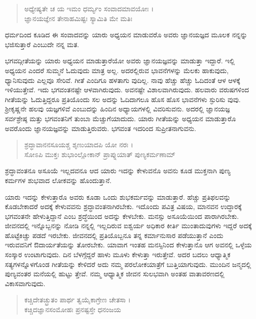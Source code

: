 \begin{verse}
ಅಧ್ಯೇಷ್ಯತೇ ಚ ಯ ಇಮಂ ಧರ್ಮ್ಯಂ ಸಂವಾದಮಾವಯೋಃ ।\\ಜ್ಞಾನಯಜ್ಞೇನ ತೇನಾಹಮಿಷ್ಟಃ ಸ್ಯಾಮಿತಿ ಮೇ ಮತಿಃ 
\end{verse}

{\small ಧರ್ಮದಿಂದ ಕೂಡಿದ ಈ ಸಂವಾದವನ್ನು ಯಾರು ಅಧ್ಯಯನ ಮಾಡುವರೊ ಅವರು ಜ್ಞಾನಯಜ್ಞದ ಮೂಲಕ ನನ್ನನ್ನು ಭಜಿಸುತ್ತಾರೆ ಎಂಬುದೇ ನನ್ನ ಮತ.}

ಭಗವದ್ಗೀತೆಯನ್ನು ಯಾರು ಅಧ್ಯಯನ ಮಾಡುತ್ತಾರೆಯೋ ಅವರು ಜ್ಞಾನಯಜ್ಞವನ್ನು ಮಾಡುತ್ತಾ ಇದ್ದಾರೆ. ಇಲ್ಲಿ ಅಧ್ಯಯನ ಎಂದರೆ ಸುಮ್ಮನೆ ಓದುವುದು ಮಾತ್ರ ಅಲ್ಲ. ಅದರಲ್ಲಿರುವ ಭಾವನೆಗಳನ್ನು ಮೆಲಕು ಹಾಕುವುದು, ಧ್ಯಾನಿಸುವುದು ಎಲ್ಲವೂ ಸೇರಿವೆ. ಗೀತೆ ಎಂದಿಗೂ ಹಳತಾಗು ವುದಿಲ್ಲ. ನಾವು ಹೆಚ್ಚು ಹೆಚ್ಚು ಓದಿದಂತೆ ಆಳ ಆಳಕ್ಕೆ ಇಳಿಯುತ್ತೇವೆ. ಇದು ಭಗವಂತನಷ್ಟೇ ಆಳವಾಗಿರುವುದು. ಅವನಷ್ಟೇ ವಿಶಾಲವಾಗಿರುವುದು. ಹಲವಾರು ವರುಷಗಳಿಂದ ಗೀತೆಯನ್ನು ಓದುತ್ತಿದ್ದರೂ ಪ್ರತಿಯೊಂದು ಸಲ ಅದನ್ನು ಓದಿದಾಗಲೂ ಹೊಸ ಹೊಸ ಭಾವನೆಗಳು ಸ್ಫುರಿಸು ವುವು. ಶ್ರೀಕೃಷ್ಣನೇ ಹಲವು ಯಜ್ಞಗಳಿವೆ ಎಂಬುದನ್ನು ಹಿಂದಿನ ಅಧ್ಯಾಯಗಳಲ್ಲಿ ವಿವರಿಸುವನು. ಅದರಲ್ಲಿ ಜ್ಞಾನಯಜ್ಞ ಸರ್ವಶ್ರೇಷ್ಠ ಮತ್ತು ಭಗವಂತನಿಗೆ ತುಂಬಾ ಮೆಚ್ಚುಗೆಯಾದುದು. ಯಾರು ಗೀತೆಯನ್ನು ಅಧ್ಯಯನ ಮಾಡುತ್ತಾರೊ ಅವರೊಂದು ಜ್ಞಾನಯಜ್ಞವನ್ನು ಮಾಡುತ್ತಿರುವರು. ಭಗವಂತ ಇದರಿಂದ ಸುಪ್ರೀತನಾಗುವನು.

\begin{verse}
ಶ್ರದ್ಧಾವಾನನಸೂಯಶ್ಚ ಶೃಣುಯಾದಪಿ ಯೋ ನರಃ ।\\ಸೋಽಪಿ ಮುಕ್ತಃ ಶುಭಾಂಲ್ಲೋಕಾನ್ ಪ್ರಾಪ್ನುಯಾತ್ ಪುಣ್ಯಕರ್ಮಣಾಮ್ 
\end{verse}

{\small ಶ್ರದ್ಧಾವಂತನೂ ಅಸೂಯೆ ಇಲ್ಲದವನೂ ಆದ ಯಾರು ಇದನ್ನು ಕೇಳುವನೊ ಅವನು ಕೂಡ ಮುಕ್ತನಾಗಿ ಪುಣ್ಯ ಕರ್ಮಗಳ ಶುಭವಾದ ಲೋಕವನ್ನು ಹೊಂದುತ್ತಾನೆ.}

ಯಾರು ಇದನ್ನು ಕೇಳುತ್ತಾರೊ ಅವರು ಕೂಡಾ ಒಂದು ಶುಭಕರ್ಮವನ್ನು ಮಾಡುತ್ತಾರೆ. ಹೆಚ್ಚು ಪ್ರತಿಫಲವನ್ನು ಕೊಡಬೇಕಾದರೆ ಅದಕ್ಕೆ ಕೇಳುವವನು ಶ್ರದ್ಧಾವಂತನಾಗಿರಬೇಕು. ಇದೊಂದು ಪವಿತ್ರ ವಿಷಯ, ಮಾನವನ ಉದ್ಧಾರಕ್ಕೆ ಭಗವಂತನೇ ಹೇಳುತ್ತಿದ್ದಾನೆ ಎಂಬ ಶ್ರದ್ಧೆಯಿಂದ ಅದನ್ನು ಕೇಳಬೇಕು. ಮನಸ್ಸು ಅಸೂಯೆಯಿಂದ ಪಾರಾಗಿರಬೇಕು. ಜೀವನದಲ್ಲಿ ಇನ್ನೊಬ್ಬನನ್ನು ನೋಡಿ ನನ್ನಲ್ಲಿ ಇಲ್ಲದಿರುವ ಐಶ್ವರ್ಯ ಅಧಿಕಾರ ಕೀರ್ತಿ ಮುಂತಾದುವುಗಳು ಇದ್ದರೆ ಅದಕ್ಕೆ ಹೊಟ್ಟೆಕಿಚ್ಚು ಪಡದೆ ಇರಬೇಕು. ಜೀವನದಲ್ಲಿ ಪ್ರತಿಯೊಬ್ಬನೂ ತನ್ನ ಕರ್ಮಾನುಸಾರ ಪಡೆಯುತ್ತಾನೆ ಎಂದು ಇರುವವನಿಗೆ ಔದಾರ್ಯತೆಯನ್ನು ತೋರಬೇಕು. ಯಾವಾಗ ಇಂತಹ ಮನಸ್ಸಿನಿಂದ ಕೇಳುತ್ತಾನೊ ಆಗ ಅವನಲ್ಲಿ ಒಳ್ಳೆಯ ಸಂಸ್ಕಾರ ಉಂಟಾಗುವುದು. ದಿನ ಬೆಳಗ್ಗೆದ್ದರೆ ಹಾಳು ಮೂಳು ಕೇಳುತ್ತಾ ಇರುತ್ತೇವೆ. ಅದರ ಬದಲು ಆಧ್ಯಾತ್ಮಿಕ ಸತ್ಯಗಳನ್ನೊಳಗೊಂಡ ಗೀತೆಯನ್ನು ಕೇಳಿದರೆ ಅದು ನಮ್ಮ ಪರಲೋಕಯಾತ್ರೆಗೆ ಬುತ್ತಿಯಾಗುವುದು. ಮುಂದಿನ ಜನ್ಮದಲ್ಲಿ ಪುಣ್ಯವಂತರ ಮನೆಯಲ್ಲಿ ಹುಟ್ಟು ತ್ತೇವೆ. ನಮ್ಮ ಆಧ್ಯಾತ್ಮಿಕ ಜೀವನ ಸುಲಭವಾಗಿ ಅಂತಹ ವಾತಾವರಣದಲ್ಲಿ ವಿಕಾಸವಾಗುವುದು.

\begin{verse}
ಕಚ್ಚಿದೇತಚ್ಛ್ರುತಂ ಪಾರ್ಥ ತ್ವಯೈಕಾಗ್ರೇಣ ಚೇತಸಾ ।\\ಕಚ್ಚಿದಜ್ಞಾನಸಂಮೋಹಃ ಪ್ರನಷ್ಟಸ್ತೇ ಧನಂಜಯ 
\end{verse}

